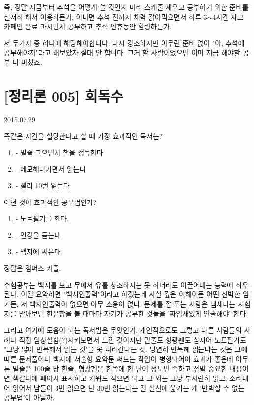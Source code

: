 즉, 정말 지금부터 추석을 어떻게 쓸 것인지 미리 스케줄 세우고 공부하기 위한 준비를 철저히 해서 이용하든가,
아니면 추석 전까지 체력 갉아먹으면서 하루 3$\sim$4시간 자고 카페인 음료 마시면서 공부하고 추석 연휴동안 힐링하든가.
\vspace{5mm}

저 두가지 중 하나에 해당해야합니다.
다시 강조하지만 아무런 준비 없이 "아, 추석에 공부해야지"라고 해보았자 절대 안 합니다.
그거 할 사람이었으면 이미 지금 해야할 공부 다 마쳤죠.
\vspace{5mm}






\section{[정리론 005] 회독수}
\href{https://www.kockoc.com/Apoc/221864}{2015.07.29}

\vspace{5mm}

똑같은 시간을 할당한다고 할 때 가장 효과적인 독서는?
\vspace{5mm}

    
\begin{enumerate}[label=\alph*]
    \item -  밑줄 그으면서 책을 정독한다
    \item - 메모해나가면서 읽는다
    \item - 빨리 10번 읽는다    
\end{enumerate}


어떤 것이 효과적인 공부법인가?

\begin{enumerate}[label=\alph*]
    \item -  노트필기를 한다.
    \item - 인강을 듣는다
    \item - 백지에 써본다.
\end{enumerate}

정답은 캠퍼스 커플.
\vspace{5mm}

수험공부는 백지를 보고 무에서 유를 창조하지는 못 하더라도 이끌어내는 능력에 좌우된다.
이걸 요약하면 "백지인출력"이라고 하겠는데
사실 깊은 이해이든 어떤 신박한 암기든, 저 백지인출력이 없으면 아무 소용이 없다.
문제를 잘 푸는 사람은 냄새나는 시험지를 받아보면 한문항을 볼 때마다 자기가 공부한 것들을 '짜임새있게 인출해야' 한다.
\vspace{5mm}

그리고 여기에 도움이 되는 독서법은 무엇인가.
개인적으로도 그렇고 다른 사람들의 사례나 직접 임상실험(?)시켜보면서 느낀 것이지만
밑줄도 형광펜도 심지어 노트필기도 "그냥 많이 반복해서 읽는 것"을 못 따라간다는 것.
당연히 반복해 읽는다는 것은 그에 따른 문제풀이나 백지에 서술형 요약문 써보는 작업이 병행되어야 효과가 좋은데
아무튼 밑줄은 100줄 당 한줄, 형광펜은 한쪽에 한 단어 정도면 족하고
정말 중요한 내용이면 책갈피에 페이지 표시하고 키워드 적으면 되고
그 외는 그냥 부지런히 읽고, 소리내어 읽어서 남들이 3번 읽으면 난 30번 읽는다는 걸 실천에 옮기는 게 '반박할 수 없는 공부법'이 아닐까.
\vspace{5mm}

